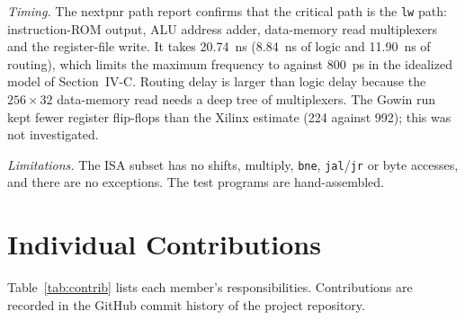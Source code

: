 \documentclass[conference]{IEEEtran}
\begin{document}
\emph{Timing.} The nextpnr path report confirms that the critical path is the
\texttt{lw} path: instruction-ROM output, ALU address adder, data-memory read
multiplexers and the register-file write. It takes 20.74~ns (8.84~ns of logic
and 11.90~ns of routing), which limits the maximum frequency to \fmaxvalue{}
against 800~ps in the idealized model of Section~IV-C. Routing delay is larger
than logic delay because the $256\times32$ data-memory read needs a deep tree
of multiplexers. The Gowin run kept fewer register flip-flops than the Xilinx
estimate (224 against 992); this was not investigated.

\emph{Limitations.} The ISA subset has no shifts, multiply, \texttt{bne},
\texttt{jal}/\texttt{jr} or byte accesses, and there are no exceptions. The
test programs are hand-assembled.

\FloatBarrier
\section{Individual Contributions}
Table~\ref{tab:contrib} lists each member's responsibilities. Contributions are
recorded in the GitHub commit history of the project repository.

\begin{table}[!tbp]
\caption{Individual contributions}
\label{tab:contrib}
\centering
\footnotesize
{}
\end{table}
\end{document}
